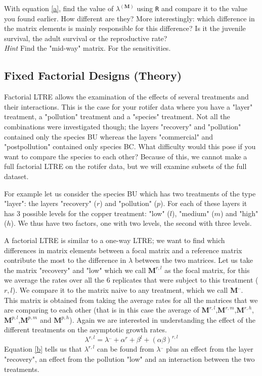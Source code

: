 \documentclass{article}\usepackage[]{graphicx}\usepackage[]{color}
\begin{document}
With equation \ref{a}, find the value of $\lambda^{(\boldsymbol{M})}$ using \texttt{R} and compare it to the value you found earlier. How different are they? More interestingly: which difference in the matrix elements is mainly responsible for this difference? Is it the juvenile survival, the adult survival or the reproductive rate?\\[1.5ex]

\textit{Hint} Find the "mid-way" matrix. For the sensitivities.

\subsection{Fixed Factorial Designs (Theory)}
Factorial LTRE allows the examination of the effects of several treatments and their interactions. This is the case for your rotifer data where you have a "layer" treatment, a "pollution" treatment and a "species" treatment. Not all the combinations were investigated though; the layers "recovery" and "pollution" contained only the species BU whereas the layers "commercial" and "postpollution" contained only species BC. What difficulty would this pose if you want to compare the species to each other? Because of this, we cannot make a full factorial LTRE on the rotifer data, but we will examine subsets of the full dataset.


For example let us consider the species BU which has two treatments of the type "layer": the layers "recovery" ($r$) and "pollution" ($p$). For each of these layers it has 3 possible levels for the copper treatment: "low" ($l$), "medium" ($m$) and "high" ($h$). We thus have two factors, one with two levels, the second with three levels.

A factorial LTRE is similar to a one-way LTRE; we want to find which differences in matrix elements between a focal matrix and a reference matrix contribute the most to the difference in $\lambda$ between the two matrices. Let us take the matrix "recovery" and "low" which we call $\boldsymbol{M}^{r,l}$ as the focal matrix, for this we average the rates over all the $6$ replicates that were subject to this treatment ($r,l$). We compare it to the matrix naive to any treatment, which we call $\boldsymbol{M}^{..}$. This matrix is obtained from taking the average rates for all the matrices that we are comparing to each other (that is in this case the average of $\boldsymbol{M}^{r,l}$,$\boldsymbol{M}^{r,m}$,$\boldsymbol{M}^{r,h}$,$\boldsymbol{M}^{p,l}$,$\boldsymbol{M}^{p,m}$ and $\boldsymbol{M}^{p,h}$). Again we are interested in understanding the effect of the different treatments on the asymptotic growth rates.
\begin{equation}\label{b}
\lambda^{r,l}=\lambda^{..}+\alpha^{r}+\beta^{l}+(\alpha \beta)^{r,l}
\end{equation}
Equation \ref{b} tells us that $\lambda^{r,l}$ can be found from $\lambda^{..}$ plus an effect from the layer "recovery", an effect from the pollution "low" and an interaction between the two treatments.
\end{document}
